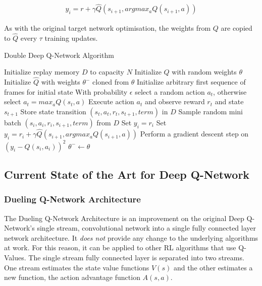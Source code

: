 \begin{align}
    \label{equ:DubTarget}
    y_i = r + \gamma \hat{Q}(s_{i+1}, argmax_aQ(s_{i+1}, a))
\end{align}

As with the original target network optimisation, the weights from $Q$ are copied to $\hat{Q}$
every $\tau$ training updates.

\begin{algorithm}
    \caption{Double Deep Q-Network Algorithm} \label{alg:DDQN}
    \begin{algorithmic}[1]
        \State Initialize replay memory $D$ to capacity $N$
        \State Initialize $Q$ with random weights $\theta$
        \State Initialize $\hat{Q}$ with weights $\theta^-$ cloned from $\theta$
        \State Initialize arbitrary first sequence of frames for initial state
        \State With probability $\epsilon$ select a random action $a_t$, otherwise select $a_t = max_a Q(s_t, a)$
        \State Execute action $a_t$ and observe reward $r_t$ and state $s_{t+1}$
        \State Store state transition $(s_t, a_t, r_t, s_{t+1}, term)$ in $D$
        \State Sample random mini batch $(s_i, a_i, r_i, s_{i + 1}, term)$ from $D$
        \State Set $y_i = r_i$
        \Else
        \State Set $y_i = r_i + \gamma \hat{Q}(s_{i+1}, argmax_aQ(s_{i+1}, a))$ \label{DDQN:target}
        \EndIf
        \EndFor
        \State Perform a gradient descent step on $(y_i - Q(s_i, a_i))^2$
        $\theta^- \leftarrow \theta$
        \EndIf
        \EndFor
    \end{algorithmic}
\end{algorithm}

\subsection{Current State of the Art for Deep Q-Network}
\subsubsection{Dueling Q-Network Architecture}
The Dueling Q-Network Architecture is an improvement on the original Deep Q-Network's single stream, convolutional network into a single fully connected layer network architecture. It \textit{does not} provide any change to the underlying algorithms at work. For this reason, it can be applied to other RL algorithms that use Q-Values. The single stream fully connected layer is separated into two streams. One stream estimates the state value functions $V(s)$ and the other estimates a new function, the action advantage function $A(s, a)$.

